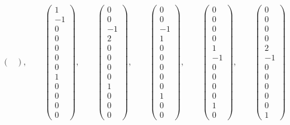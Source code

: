 \documentclass[11pt,a4paper]{article}
\begin{document}
{\[\begin{pmatrix}
\end{pmatrix},\quad\quad\begin{pmatrix}
1\\-1\\0\\0\\0\\0\\0\\1\\0\\0\\0\\0
\end{pmatrix},\quad\quad\begin{pmatrix}
0\\0\\-1\\2\\0\\0\\0\\0\\1\\0\\0\\0
\end{pmatrix},\quad\quad\begin{pmatrix}
0\\0\\-1\\1\\0\\0\\0\\0\\0\\1\\0\\0
\end{pmatrix},\quad\quad\begin{pmatrix}
0\\0\\0\\0\\1\\-1\\0\\0\\0\\0\\1\\0
\end{pmatrix},\quad\quad\begin{pmatrix}
0\\0\\0\\0\\2\\-1\\0\\0\\0\\0\\0\\1

\end{pmatrix}\]}
\end{document}
